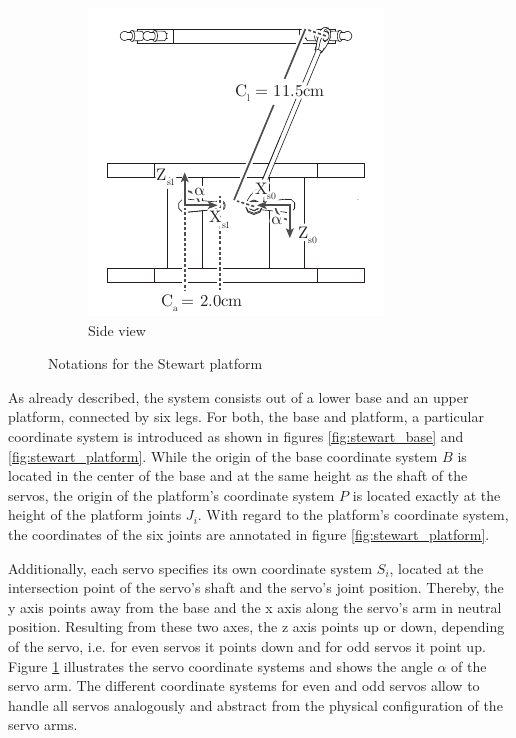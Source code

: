 \begin{figure}
	\begin{subfigure}{0.49\textwidth}
		\centering
		\includegraphics{../figures/stewart_side}
		\caption{Side view}
		\label{fig:stewart_side}
	\end{subfigure}
	\caption{Notations for the Stewart platform}
	\label{fig:stewart_notation}
\end{figure}

As already described, the system consists out of a lower base and an upper
platform, connected by six legs. For both, the base and platform, a particular
coordinate system is introduced as shown in figures \ref{fig:stewart_base} and
\ref{fig:stewart_platform}. While the origin of the base coordinate system $B$
is located in the center of the base and at the same height as the shaft of
the servos, the origin of the platform's coordinate system $P$ is located
exactly at the height of the platform joints $J_i$. With regard to the
platform's coordinate system, the coordinates of the six joints are annotated
in figure \ref{fig:stewart_platform}.

Additionally, each servo specifies its own coordinate system $S_i$, located at
the intersection point of the servo's shaft and the servo's joint position.
Thereby, the y axis points away from the base and the x axis along the servo's
arm in neutral position. Resulting from these two axes, the z axis points up
or down, depending of the servo, i.e. for even servos it points down and for
odd servos it point up. Figure \ref{fig:stewart_side} illustrates the servo
coordinate systems and shows the angle $\alpha$ of the servo arm. The
different coordinate systems for even and odd servos allow to handle all
servos analogously and abstract from the physical configuration of the servo
arms.

